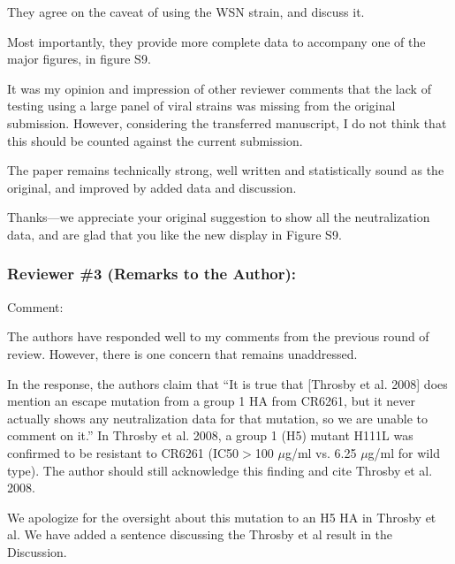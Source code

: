 \documentclass[11pt, oneside]{article}   	%
\begin{document}
They agree on the caveat of using the WSN strain, and discuss it.

Most importantly, they provide more complete data to accompany one of the major figures, in figure S9.

It was my opinion and impression of other reviewer comments that the lack of testing using a large panel of viral strains was missing from the original submission. However, considering the transferred manuscript, I do not think that this should be counted against the current submission.

The paper remains technically strong, well written and statistically sound as the original, and improved by added data and discussion.

{\color{black}
Thanks---we appreciate your original suggestion to show all the neutralization data, and are glad that you like the new display in Figure S9.
}

\subsubsection*{Reviewer \#3 (Remarks to the Author):}

Comment:

The authors have responded well to my comments from the previous round of review. However, there is one concern that remains unaddressed.

In the response, the authors claim that ``It is true that [Throsby et al. 2008] does mention an escape mutation from a group 1 HA from CR6261, but it never actually shows any neutralization data for that mutation, so we are unable to comment on it.'' In Throsby et al. 2008, a group 1 (H5) mutant H111L was confirmed to be resistant to CR6261 (IC50$>$100 $\mu$g/ml vs. 6.25 $\mu$g/ml for wild type). The author should still acknowledge this finding and cite Throsby et al. 2008. 

{\color{black}
We apologize for the oversight about this mutation to an H5 HA in Throsby et al.
We have added a sentence discussing the Throsby et al result in the Discussion.
}
\end{document}
